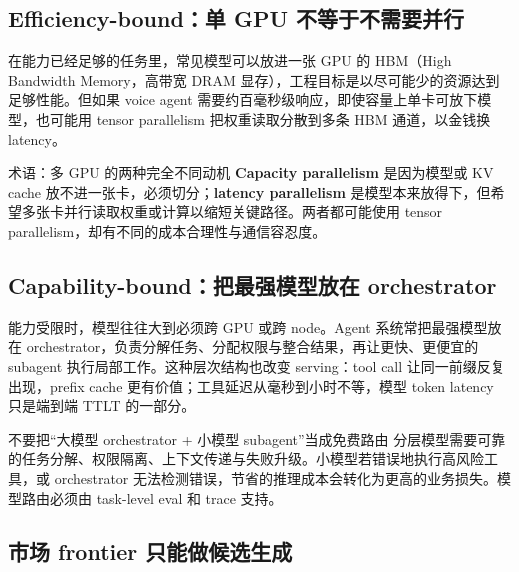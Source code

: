 \subsection{Efficiency-bound：单 GPU 不等于不需要并行}

在能力已经足够的任务里，常见模型可以放进一张 GPU 的 HBM（High Bandwidth Memory，高带宽 DRAM 显存），工程目标是以尽可能少的资源达到足够性能。但如果 voice agent 需要约百毫秒级响应，即使容量上单卡可放下模型，也可能用 tensor parallelism 把权重读取分散到多条 HBM 通道，以金钱换 latency。


\begin{knowledgebox}{术语：多 GPU 的两种完全不同动机}
\textbf{Capacity parallelism} 是因为模型或 KV cache 放不进一张卡，必须切分；\textbf{latency parallelism} 是模型本来放得下，但希望多张卡并行读取权重或计算以缩短关键路径。两者都可能使用 tensor parallelism，却有不同的成本合理性与通信容忍度。
\end{knowledgebox}


\subsection{Capability-bound：把最强模型放在 orchestrator}

能力受限时，模型往往大到必须跨 GPU 或跨 node。Agent 系统常把最强模型放在 orchestrator，负责分解任务、分配权限与整合结果，再让更快、更便宜的 subagent 执行局部工作。这种层次结构也改变 serving：tool call 让同一前缀反复出现，prefix cache 更有价值；工具延迟从毫秒到小时不等，模型 token latency 只是端到端 TTLT 的一部分。


\begin{warningbox}{不要把“大模型 orchestrator + 小模型 subagent”当成免费路由}
分层模型需要可靠的任务分解、权限隔离、上下文传递与失败升级。小模型若错误地执行高风险工具，或 orchestrator 无法检测错误，节省的推理成本会转化为更高的业务损失。模型路由必须由 task-level eval 和 trace 支持。
\end{warningbox}

\subsection{市场 frontier 只能做候选生成}

